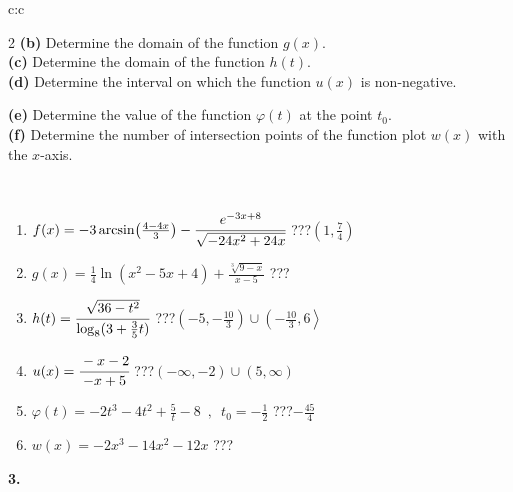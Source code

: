 \documentclass[10pt]{report}
\begin{document}
\begin{tabular}{c:c}
\begin{minipage}[c][104.5mm][t]{0.5\linewidth}
\begin{center}
\begin{minipage}{0.95\linewidth}
\begin{center}
{\begin{multicols}{2}
\textbf{(b)} Determine the domain of the function \(g(x)\). \\[1mm]
\textbf{(c)} Determine the domain of the function \(h(t)\). \\[1mm]
\textbf{(d)} Determine the interval on which the function \(u(x)\) is non-negative. \par \columnbreak
\textbf{(e)} Determine the value of the function \(\varphi(t)\) at the point \(t_0\). \\[1mm]
\textbf{(f)} Determine the number of intersection points of the function plot \(w(x)\) with the \(x\)-axis. \\[1mm]
\end{multicols}
}
\end{center}
\end{minipage}
\\[4mm]
\begin{minipage}{0.79\linewidth}
\begin{center}
\begin{varwidth}{\linewidth}
\begin{enumerate}
\small
\item $f(x) = -3\arcsin\!\left( \frac{4-4x}{3} \right) - \cfrac{e^{-3x+8}}{\sqrt{-24x^2+24x}}$\quad \dotfill\; ???\;\dotfill \quad $\left(1 , \frac{7}{4}\right)$
\item $g(x) = \frac{1}{4} \ln{\!(x^2-5x+4)}+\frac{\sqrt[3]{9-x}}{x-5}$\quad \dotfill\; ???\;\dotfill {}
\item $h(t) = \cfrac{\sqrt{36-t^2}}{\log_8(3+\frac{3}{5}t)}$\quad \dotfill\; ???\;\dotfill \quad $\left(-5 , -\frac{10}{3}\right)\cup\left(-\frac{10}{3} , 6\right\rangle$
\item $u(x) = \cfrac{-x-2}{-x+5}$\quad \dotfill\; ???\;\dotfill \quad $\left(-\infty , -2\right)\cup\left(5 , \infty\right)$
\item $\varphi(t) = -2t^3-4t^2+\frac{5}{t}-8 \enspace , \enspace t_0=-\frac{1}{2}$\quad \dotfill\; ???\;\dotfill \quad $-\frac{45}{4}$
\item $w(x) = -2x^3-14x^2-12x$\quad \dotfill\; ???\;\dotfill {}
\end{enumerate}
\end{varwidth}
\end{center}
\end{minipage}
\begin{minipage}{0.20\linewidth}
\begin{center}
{\Huge\bfseries 3.} \\[2mm]

\end{center}
\end{minipage}
\end{center}
\end{minipage}
\end{tabular}
\end{document}
